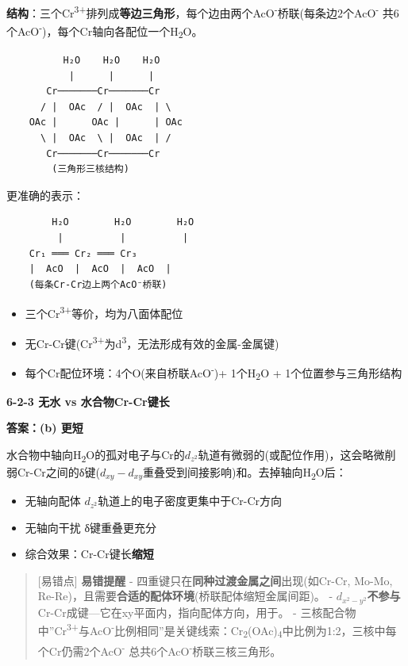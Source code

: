 \textbf{结构}：三个Cr\textsuperscript{3+}排列成\textbf{等边三角形}，每个边由两个AcO\textsuperscript{-}桥联(每条边2个AcO\textsuperscript{-} \箭 共6个AcO\textsuperscript{-})，每个Cr轴向各配位一个H\textsubscript{2}O。

\begin{verbatim}
          H₂O    H₂O    H₂O
           |      |      |
       Cr───────Cr───────Cr
      / |  OAc  / |  OAc  | \
    OAc |      OAc |      | OAc
      \ |  OAc  \ |  OAc  | /
       Cr───────Cr───────Cr
        (三角形三核结构)
\end{verbatim}

更准确的表示：

\begin{verbatim}
        H₂O        H₂O        H₂O
         |          |          |
    Cr₁ ═══ Cr₂ ═══ Cr₃
    |  AcO  |  AcO  |  AcO  |
    (每条Cr-Cr边上两个AcO⁻桥联)
\end{verbatim}

\begin{itemize}
\tightlist
\item
  三个Cr\textsuperscript{3+}等价，均为八面体配位
\item
  无Cr-Cr键(Cr\textsuperscript{3+}为d\textsuperscript{3}，无法形成有效的金属-金属键)
\item
  每个Cr配位环境：4个O(来自桥联AcO\textsuperscript{-})+ 1个H\textsubscript{2}O + 1个位置参与三角形结构
\end{itemize}

\textbf{6-2-3 无水 vs 水合物Cr-Cr键长}

\textbf{答案：(b) 更短}

水合物中轴向H\textsubscript{2}O的孤对电子与Cr的\(d_{z^2}\)轨道有微弱的(或配位作用)，这会略微削弱Cr-Cr之间的δ键(\(d_{xy}-d_{xy}\)重叠受到间接影响)和。去掉轴向H\textsubscript{2}O后：

\begin{itemize}
\tightlist
\item
  无轴向配体 \箭 \(d_{z^2}\)轨道上的电子密度更集中于Cr-Cr方向 \箭 
\item
  无轴向干扰 \箭 δ键重叠更充分
\item
  综合效果：Cr-Cr键长\textbf{缩短}
\end{itemize}

\begin{quote}
{[}易错点{]} \textbf{易错提醒}
- 四重键只在\textbf{同种过渡金属之间}出现(如Cr-Cr, Mo-Mo, Re-Re)，且需要\textbf{合适的配体环境}(桥联配体缩短金属间距)。
- \(d_{x^2-y^2}\)\textbf{不参与}Cr-Cr成键---它在xy平面内，指向配体方向，用于\西格马配位。
- 三核配合物中''Cr\textsuperscript{3+}与AcO\textsuperscript{-}比例相同''是关键线索：Cr\textsubscript{2}(OAc)\textsubscript{4}中比例为1:2，三核中每个Cr仍需2个AcO\textsuperscript{-} \箭 总共6个AcO\textsuperscript{-}桥联三核三角形。
\end{quote}

